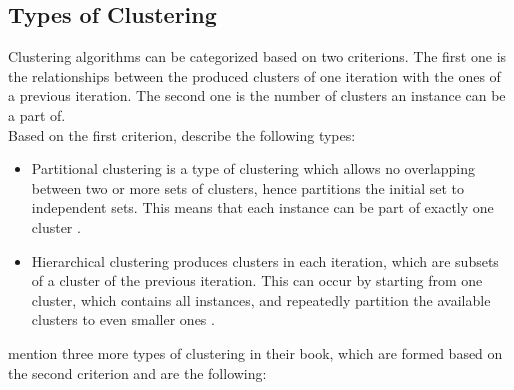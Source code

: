 \subsection{Types of Clustering}
Clustering algorithms can be categorized based on two criterions. The first one is the relationships between the produced clusters of one iteration with the ones of a previous iteration. The second one is the number of clusters an instance can be a part of. \\
Based on the first criterion, \textcite{tanSteinKum} describe the following types: \\
\begin{itemize}
\item Partitional clustering is a type of clustering which allows no overlapping between two or more sets of clusters, hence partitions the initial set to independent sets. This means that each instance can be part of exactly one cluster \autocite[492]{tanSteinKum}. \\
\item Hierarchical clustering produces clusters in each iteration, which are subsets of a cluster of the previous iteration. This can occur by starting from one cluster, which contains all instances, and repeatedly partition the available clusters to even smaller ones \autocite[492]{tanSteinKum}. \\
\end{itemize}
\textcite{tanSteinKum} mention three more types of clustering in their book, which are formed based on the second criterion and are the following: \\
